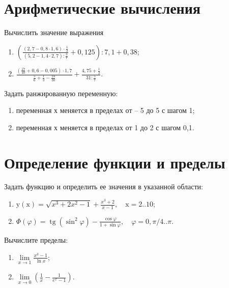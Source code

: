 \documentclass[14pt,a4paper]{article}
\begin{document}
\section{Арифметические вычисления}
\noindent Вычислить значение выражения
\begin{enumerate}
	\item $\left(\frac{(2,7-0,8 \cdot 1,6) \cdot \frac{1}{3}}{(5,2-1,4 \cdot 2,7): \frac{3}{7}}+0,125\right): 7,1+0,38$;
	\item $\frac{\left(\frac{17}{40}+0,6-0,005\right) \cdot 1,7}{\frac{5}{6}+\frac{1}{3}-\frac{23}{30}}+\frac{4,75+\frac{1}{2}}{31: \frac{5}{7}}$.
\end{enumerate}
Задать ранжированную переменную:
\begin{enumerate}
	\item переменная х меняется в пределах от – 5 до 5 с шагом 1;
	\item переменная х меняется в пределах от 1 до 2 с шагом 0,1.
\end{enumerate}
\section{Определение функции и пределы}
\noindent Задать функцию и определить ее значения в указанной области:

\begin{enumerate}
	\item $\mathrm{y}(\mathrm{x})=\sqrt{x^3+2 x^2-1}+\frac{x^3+2}{x-1},\quad \mathrm{x}=2 . .10$;
	\item $\Phi(\varphi)=\operatorname{tg}\left(\sin ^2 \varphi\right)-\frac{\cos \varphi}{1+\sin \varphi}, \quad \varphi=0, \pi / 4 . . \pi$.
\end{enumerate}
\noindent Вычислите пределы:
\begin{multicols}{2}
\begin{enumerate}
	\item $\lim\limits_{x \rightarrow 1} \frac{x^3-1}{\ln x}$;
	\item $\lim\limits_{x \rightarrow 0}\left(\frac{1}{x}-\frac{1}{e^x-1}\right)$.
\end{enumerate}
\end{multicols}
\end{document}
